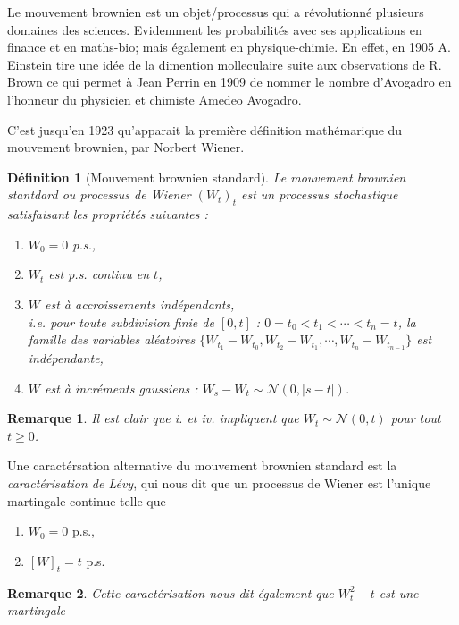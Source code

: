 \documentclass[openany]{book}
\newcommand{\1}{\mathbbm{1}}
\theoremstyle{thmfont}
\theoremstyle{deffont}
\newtheorem{definition}[definition]{Définition}
\theoremstyle{thmfont}
\theoremstyle{deffont}
\newtheorem*{remark}{Remarque}
\begin{document}
Le mouvement brownien est un objet/processus qui a révolutionné plusieurs domaines des sciences. Evidemment les probabilités avec ses applications en finance et en maths-bio; mais également en physique-chimie. En effet, en 1905 A. Einstein tire une idée de la dimention molleculaire suite aux observations de R. Brown ce qui permet à Jean Perrin en 1909 de nommer le nombre d'Avogadro en l'honneur du physicien et chimiste Amedeo Avogadro.

C'est jusqu'en 1923 qu'apparait la première définition mathémarique du mouvement brownien, par Norbert Wiener.


\begin{definition}[Mouvement brownien standard] Le \textit{mouvement brownien stantdard} ou \textit{processus de Wiener} $(W_t)_t$ est un processus stochastique satisfaisant les propriétés suivantes :
  \begin{enumerate}
  \item $W_0 = 0$ p.s.,
  \item $W_t$ est p.s. continu en $t$,
  \item $W$ est à accroissements indépendants,\\
    i.e. pour toute subdivision finie de $[0,t]$ :  $0 = t_0 < t_1 < \cdots < t_n = t$, la famille des variables aléatoires
    $\{W_{t_1} - W_{t_0}, W_{t_2} - W_{t_1}, \cdots ,W_{t_n} - W_{t_{n-1}}\}$
    est indépendante,
  \item $W$ est à incréments gaussiens : $W_s - W_t \sim \mathcal{N}(0,|s-t|)$.
  \end{enumerate}
  \label{def:MvtBorwnien}
\end{definition}

\begin{remark}
  Il est clair que \textit{i.} et \textit{iv.} impliquent que $W_t \sim \mathcal{N}(0,t)$ pour tout $t \geq 0$.
\end{remark}


Une caractérsation alternative du mouvement brownien standard est la \textit{caractérisation de Lévy}, qui nous dit que un processus de Wiener est l'unique martingale continue telle que
\begin{enumerate}
\item $W_0 = 0$ p.s.,
\item $[W]_t = t$ p.s.
  \label{def:MvtBorwnien_caractLevy}
\end{enumerate}

\begin{remark}
  Cette caractérisation nous dit également que $W_t^2 - t$ est une martingale
\end{remark}
\end{document}

